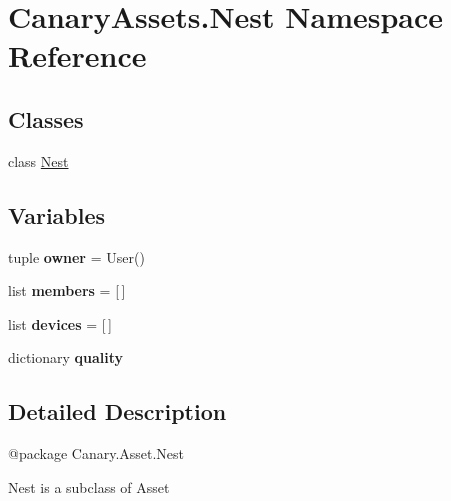 \hypertarget{namespace_canary_assets_1_1_nest}{\section{Canary\-Assets.\-Nest Namespace Reference}
\label{namespace_canary_assets_1_1_nest}
}
\subsection*{Classes}
\begin{DoxyCompactItemize}
\item 
class \hyperlink{class_canary_assets_1_1_nest_1_1_nest}{Nest}
\end{DoxyCompactItemize}
\subsection*{Variables}
\begin{DoxyCompactItemize}
\item 
\hypertarget{namespace_canary_assets_1_1_nest_a861c75fd638182e19205052a80b368db}{tuple {\bfseries owner} = User()}\label{namespace_canary_assets_1_1_nest_a861c75fd638182e19205052a80b368db}

\item 
\hypertarget{namespace_canary_assets_1_1_nest_a2e64931a173179de2479254126544527}{list {\bfseries members} = \mbox{[}$\,$\mbox{]}}\label{namespace_canary_assets_1_1_nest_a2e64931a173179de2479254126544527}

\item 
\hypertarget{namespace_canary_assets_1_1_nest_ad01b5076589d0887e80c5bfc0faf0cf5}{list {\bfseries devices} = \mbox{[}$\,$\mbox{]}}\label{namespace_canary_assets_1_1_nest_ad01b5076589d0887e80c5bfc0faf0cf5}

\item 
dictionary {\bfseries quality}
\end{DoxyCompactItemize}


\subsection{Detailed Description}
\begin{DoxyVerb}@package Canary.Asset.Nest

Nest is a subclass of Asset
\end{DoxyVerb}
 

